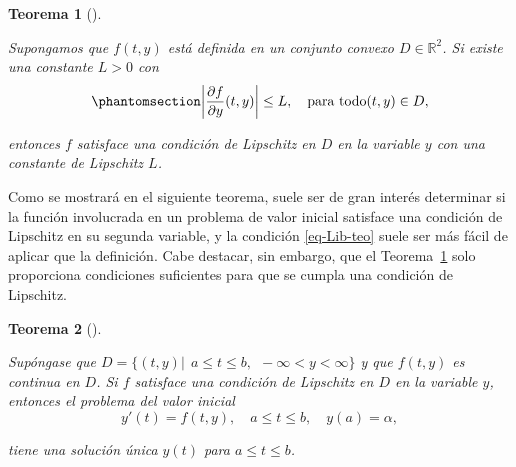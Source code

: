 \documentclass[
  spanish,
  us-letterpaper,
  DIV=11,
  numbers=noendperiod]{scrreprt}
\theoremstyle{plain}
\newtheorem{theorem}{Teorema}[chapter]
\theoremstyle{definition}
\theoremstyle{remark}
\begin{document}
\begin{theorem}[]\protect\hypertarget{thm-Lib-teo}{}\label{thm-Lib-teo}

Supongamos que \(f(t, y)\) está definida en un conjunto convexo
\(D \in \mathbb{R}^2\). Si existe una constante \(L > 0\) con
\begin{equation}\phantomsection\label{eq-Lib-teo}{
\left|\dfrac{\partial f}{\partial y}(t,y) \right| \leq L, \quad \text{para todo} (t,y)\in D,
}\end{equation}

entonces \(f\) satisface una condición de Lipschitz en \(D\) en la
variable \(y\) con una constante de Lipschitz \(L\).

\end{theorem}

Como se mostrará en el siguiente teorema, suele ser de gran interés
determinar si la función involucrada en un problema de valor inicial
satisface una condición de Lipschitz en su segunda variable, y la
condición \ref{eq-Lib-teo} suele ser más fácil de aplicar que la
definición. Cabe destacar, sin embargo, que el Teorema~\ref{thm-Lib-teo}
solo proporciona condiciones suficientes para que se cumpla una
condición de Lipschitz.

\begin{theorem}[]\protect\hypertarget{thm-uniq-sol}{}\label{thm-uniq-sol}

Supóngase que
\(D = \{(t, y) | \ \ a \leq t \leq b, \ \  -\infty < y < \infty \}\) y
que \(f (t, y)\) es continua en \(D\). Si \(f\) satisface una condición
de Lipschitz en \(D\) en la variable \(y\), entonces el problema del
valor inicial \[
y'(t)= f(t,y), \quad a\leq t \leq b, \quad y(a) = \alpha,
\]

tiene una solución única \(y(t)\) para \(a\leq t \leq b\).

\end{theorem}
\end{document}

